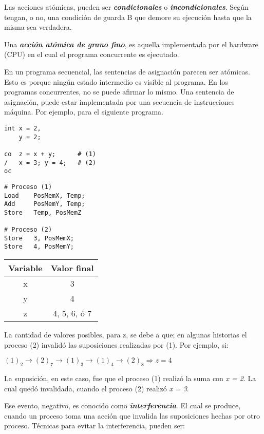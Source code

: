 \documentclass[a4paper, 10pt]{report}
\begin{document}
Las acciones atómicas, pueden ser \textbf{\emph{condicionales}} o \textbf{\emph{incondicionales}}. Según tengan, o no, una condición de guarda B que demore su ejecución hasta que la misma sea verdadera.

Una \textbf{\emph{acción atómica de grano fino}}, es aquella implementada por el hardware (CPU) en el cual el programa concurrente es ejecutado.

En un programa secuencial, las sentencias de asignación parecen ser atómicas. Esto es porque ningún estado intermedio es visible al programa. En los programas concurrentes, no se puede afirmar lo mismo. Una sentencia de asignación, puede estar implementada por una secuencia de instrucciones máquina. Por ejemplo, para el siguiente programa.

\begin{multicols}{3}
\begin{lstlisting}
int x = 2,
    y = 2;

co  z = x + y;      # (1)
/   x = 3; y = 4;   # (2)
oc
\end{lstlisting}
\columnbreak
\begin{lstlisting}
# Proceso (1)
Load    PosMemX, Temp;
Add     PosMemY, Temp;
Store   Temp, PosMemZ

# Proceso (2)
Store   3, PosMemX;
Store   4, PosMemY;
\end{lstlisting}
\columnbreak
    {\renewcommand{\arraystretch}{1.5}%
    \centering
    \begin{tabular}{cc}
        \textbf{Variable} & \textbf{Valor final}\\
        \hline 
        x & 3\\ 
        y & 4\\ 
        z & 4, 5, 6, ó 7\\
    \end{tabular}}
\end{multicols}


La cantidad de valores posibles, para z, se debe a que; en algunas historias el proceso (2) invalidó las suposiciones realizadas por (1). Por ejemplo, si:

\centerline{$(1)_2 \rightarrow (2)_7 \rightarrow (1)_3 \rightarrow (1)_4 \rightarrow (2)_8 \Rightarrow z = 4$}

La suposición, en este caso, fue que el proceso (1) realizó la suma con \emph{x = 2}. La cual quedó invalidada, cuando el proceso (2) realizó \emph{x = 3}. 

Ese evento, negativo, es conocido como \textbf{\emph{interferencia}}. El cual se produce, cuando un proceso toma una acción que invalida las suposiciones hechas por otro proceso. Técnicas para evitar la interferencia, pueden ser:
\end{document}
